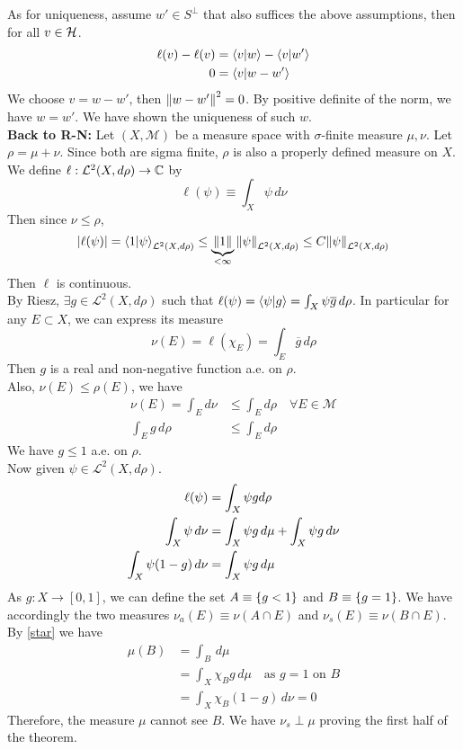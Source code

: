 \begin{prf}
As for uniqueness, assume $w'\in S^\perp$ that also suffices the above assumptions, then for all $v\in {\mathcal{H}}$. 
\begin{align*}
	\ell(v) - \ell(v) &= \bra{v}\ket{w}-\bra{v}\ket{w'}\\
					0 &= \bra{v}\ket{w-w'}
\end{align*}
We choose $v = w-w'$, then $\norm{w-w'}^2 =0$. By positive definite of the norm, we have $w = w'$. We have shown the uniqueness of such $w$.\\


\textbf{Back to R-N:} Let $(X, \mathcal{M})$ be a measure space with $\sigma$-finite measure $\mu, \nu$. Let $\rho = \mu + \nu$. Since both are sigma finite, $\rho$ is also a properly defined measure on $X$. We define $\ell: \mathcal{L}^2(X, d\rho)\to {\mathbb{C}}$ by 
$$\ell(\psi) \equiv \int_X \psi \, d\nu$$
Then since $\nu \leq \rho$,
$$\abs{\ell(\psi)} = \bra{1}\ket{\psi}_{\mathcal L^2(X, d\rho)} \leq \underbrace{\norm{1}}_{<\infty}\norm{\psi}_{\mathcal L^2(X, d\rho)} \leq C \norm{\psi}_{\mathcal L^2(X, d\rho)}$$
Then $\ell$ is continuous. \\

By Riesz, $\exists g\in \mathcal L^2(X, d\rho)$ such that $\ell(\psi) = \bra{\psi}\ket{g} = \int_X \psi \overline g\, d\rho$. In particular for any $E\subset X$, we can express its measure 
$$\nu(E) = \ell (\chi_E) = \int_E \overline g\, d\rho$$ 
Then $g$ is a real and non-negative function a.e. on $\rho$. \\

Also, $\nu(E) \leq \rho(E)$, we have
\begin{align*}
	\nu (E) = \int_E d\nu &\leq \int_E d\rho \quad \forall E\in \mathcal M\\
	\int_E g\, d\rho &\leq \int_E d\rho 
\end{align*}
We have $g\leq 1$ a.e. on $\rho$. \\

Now given $\psi\in \mathcal L^2(X, d\rho)$. 
\begin{align}
	\ell(\psi) &= \int_X \psi gd\rho \notag \\
    \int_X \psi \, d\nu &= \int_X \psi g\, d\mu + \int_X \psi g\, d\nu \notag\\
	\int_X \psi (1-g) \, d\nu &= \int_X \psi g\, d\mu \label{star}
\end{align}
As $g: X\to [0, 1]$, we can define the set $A\equiv \qty{g<1}$ and $B\equiv \qty{g=1}$. We have accordingly the two measures $\nu_a(E) \equiv \nu(A\cap E)$ and $\nu_s(E) \equiv \nu(B\cap E)$. By \eqref{star} we have
\begin{align*}
	\mu(B) &= \int_B\, d\mu\\
		   &= \int_X\chi_B g\, d\mu \quad \text{as }g = 1\text{ on }B\\
		   &= \int_X \chi_B (1-g) \, d\nu = 0 
\end{align*}
Therefore, the measure $\mu$ cannot see $B$. We have $\nu_s \perp \mu$ proving the first half of the theorem. \\


\end{prf}
